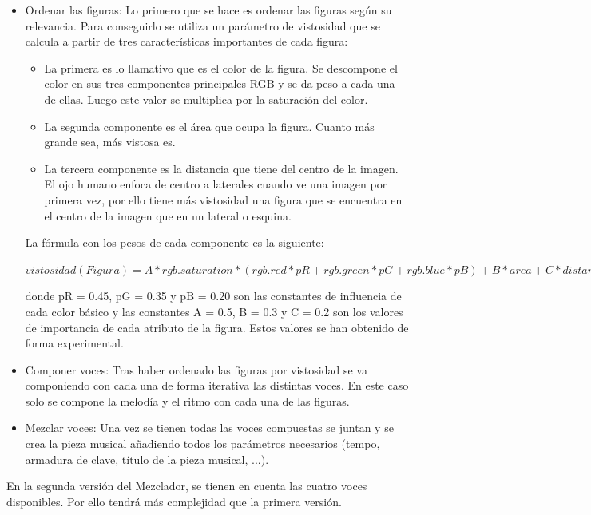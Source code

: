 \begin{itemize}
	\item Ordenar las figuras: Lo primero que se hace es ordenar las figuras según su relevancia. Para conseguirlo se utiliza un parámetro de vistosidad que se calcula a partir de tres características importantes de cada figura:
	\begin{itemize}
		\item La primera es lo llamativo que es el color de la figura. Se descompone el color en sus tres componentes principales RGB y se da peso a cada una de ellas. Luego este valor se multiplica por la saturación del color.
		\item La segunda componente es el área que ocupa la figura. Cuanto más grande sea, más vistosa es.
		\item La tercera componente es la distancia que tiene del centro de la imagen. El ojo humano enfoca de centro a laterales cuando ve una imagen por primera vez, por ello tiene más vistosidad una figura que se encuentra en el centro de la imagen que en un lateral o esquina.
	\end{itemize}
	

	La fórmula con los pesos de cada componente es la siguiente:
	\begin{center}
		$vistosidad(Figura) =
		A*rgb.saturation * (rgb.red*pR + rgb.green*pG + rgb.blue*pB)
		 + B*area + C*distanceCenter
		$
	\end{center}

donde pR = 0.45, pG = 0.35 y pB = 0.20 son las constantes de influencia de cada color básico y las constantes A = 0.5, B = 0.3 y C = 0.2 son los valores de importancia de cada atributo de la figura. Estos valores se han obtenido de forma experimental.

	\item Componer voces: Tras haber ordenado las figuras por vistosidad se va componiendo con cada una de forma iterativa las distintas voces. En este caso solo se compone la melodía y el ritmo con cada una de las figuras.

	\item Mezclar voces: Una vez se tienen todas las voces compuestas se juntan y se crea la pieza musical añadiendo todos los parámetros necesarios (tempo, armadura de clave, título de la pieza musical, ...).

\end{itemize}

En la segunda versión del Mezclador, se tienen en cuenta las cuatro voces disponibles. Por ello tendrá más complejidad que la primera versión.

